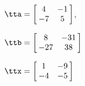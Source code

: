 {$\tta = \left[\hskip -3pt \begin{array}{cc} 4&-1 \\    -7&5 \end{array}\hskip -3pt \right] $,

$\ttb=\left[\hskip -3pt \begin{array}{cc} 8 & -31\\    -27 & 38  \end{array}\hskip -3pt \right] $}
{$\ttx=\left[\hskip -3pt \begin{array}{cc} 1 & -9\\    -4 & -5  \end{array}\hskip -3pt \right] $}
